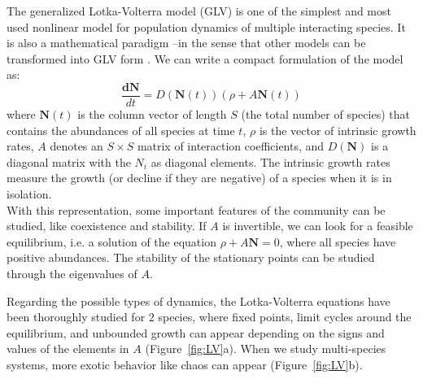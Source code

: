The generalized Lotka-Volterra model (GLV) is one of the simplest and most used nonlinear model for population dynamics of multiple interacting species. It is also a mathematical paradigm --in the sense that other models can be transformed into GLV form \cite{page2002unifying}. We can write a compact formulation of the model as:
\begin{equation}
    \frac{\textbf{dN}}{dt} = D(\textbf{N}(t))(\rho + A \textbf{N}(t))
\end{equation}
where $\textbf{N}(t)$ is the column vector of length $S$ (the total number of species) that contains the abundances of all species at time $t$, $\rho$ is the vector of intrinsic growth rates, $A$ denotes an $S \times S$ matrix of interaction coefficients, and $D(\textbf{N})$ is a diagonal matrix with the $N_i$ as diagonal elements. The intrinsic growth rates measure the growth (or decline if they are negative) of a species when it is in isolation. \\

With this representation, some important features of the community can be studied, like coexistence and stability. If $A$ is invertible, we can look for a feasible equilibrium, i.e. a solution of the equation $\rho + A\textbf{N} = 0$, where all species have positive abundances.  The stability of the stationary points can be studied through the eigenvalues of $A$. %

Regarding the possible types of dynamics, the Lotka-Volterra equations have been thoroughly studied for $2$ species, where fixed points, limit cycles around the equilibrium, and unbounded growth can appear depending on the signs and values of the elements in $A$ \cite{murray2002mathematical} 
 (Figure~\ref{fig:LV}a). When we study multi-species systems, more exotic behavior like chaos can appear \cite{houfbauer1998book} (Figure~\ref{fig:LV}b).\\ 


